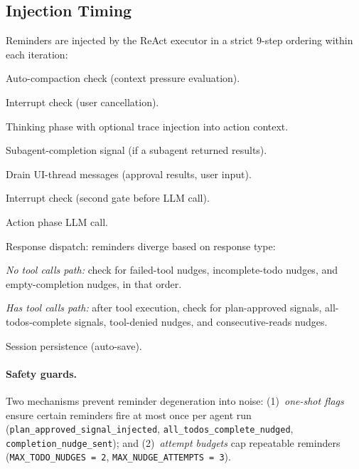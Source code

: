 \subsection{Injection Timing}
\label{app:reminder_timing}

Reminders are injected by the ReAct executor in a strict 9-step ordering within each iteration:

\begin{packedenumerate}
\item Auto-compaction check (context pressure evaluation).
\item Interrupt check (user cancellation).
\item Thinking phase with optional trace injection into action context.
\item Subagent-completion signal (if a subagent returned results).
\item Drain UI-thread messages (approval results, user input).
\item Interrupt check (second gate before LLM call).
\item Action phase LLM call.
\item Response dispatch: reminders diverge based on response type:
  \begin{packeditemize}
  \item \emph{No tool calls path:} check for failed-tool nudges, incomplete-todo nudges, and empty-completion nudges, in that order.
  \item \emph{Has tool calls path:} after tool execution, check for plan-approved signals, all-todos-complete signals, tool-denied nudges, and consecutive-reads nudges.
  \end{packeditemize}
\item Session persistence (auto-save).
\end{packedenumerate}

\paragraph{Safety guards.} Two mechanisms prevent reminder degeneration into noise: (1)~\emph{one-shot flags} ensure certain reminders fire at most once per agent run (\texttt{plan\_approved\_signal\_injected}, \texttt{all\_todos\_complete\_nudged}, \texttt{completion\_nudge\_sent}); and (2)~\emph{attempt budgets} cap repeatable reminders (\texttt{MAX\_TODO\_NUDGES~=~2}, \texttt{MAX\_NUDGE\_ATTEMPTS~=~3}).


